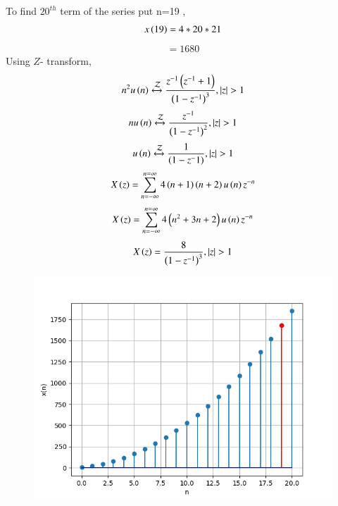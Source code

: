 \documentclass[beamer]{IEEEtran}
\theoremstyle{remark}
\begin{document}
To find $20^{th}$ term of the series put n=19 ,
\begin{align}
    x\left(19\right)=4*20*21
\end{align}
\begin{align}
    =1680
\end{align}
Using $Z$- transform,
\begin{align}
	n^2 u\left(n\right)\xleftrightarrow{\mathcal{Z}} \frac{z^{-1}\left(z^{-1}+1\right)}{\left(1-z^{-1}\right)^3} ,  \left\vert z\right\vert > 1
\end{align}
\begin{align}
	n u\left(n\right)\xleftrightarrow{\mathcal{Z}} \frac{z^{-1}}{\left(1-z^{-1}\right)^2} ,   \left\vert z\right\vert >1 
\end{align}
\begin{align}
	u\left(n\right)\xleftrightarrow{\mathcal{Z}} \frac{1}{\left(1-z^-1\right)} ,   \left\vert z\right\vert >1 
\end{align}
\begin{align}
    X\left(z\right)=\sum_{n=-\infty}^{n=\infty}4\left(n+1\right)\left(n+2\right)u\left(n\right)z^{-n}
\end{align}
\begin{align}
	X\left(z\right)=\sum_{n=-\infty}^{n=\infty}4\left(n^2+3n+2\right)u\left(n\right)z^{-n}
\end{align}
\begin{align}
	X\left(z\right)=\frac{8}{\left(1-z^{-1}\right)^3} , \left\vert z\right\vert >1
\end{align}
\begin{figure}[ht]
    \centering
    \includegraphics[width=1\columnwidth]{graphs/digital2_graph.png}
    
	\label{fig:11.9.5.22.1}
\end{figure}
\end{document}
